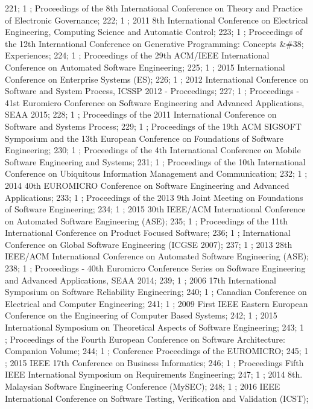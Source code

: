 221; 1 ; Proceedings of the 8th International Conference on Theory and Practice of Electronic Governance; 
222; 1 ; 2011 8th International Conference on Electrical Engineering, Computing Science and Automatic Control; 
223; 1 ; Proceedings of the 12th International Conference on Generative Programming: Concepts {\&}{\#}38; Experiences; 
224; 1 ; Proceedings of the 29th ACM/IEEE International Conference on Automated Software Engineering; 
225; 1 ; 2015 International Conference on Enterprise Systems (ES); 
226; 1 ; 2012 International Conference on Software and System Process, ICSSP 2012 - Proceedings; 
227; 1 ; Proceedings - 41st Euromicro Conference on Software Engineering and Advanced Applications, SEAA 2015; 
228; 1 ; Proceedings of the 2011 International Conference on Software and Systems Process; 
229; 1 ; Proceedings of the 19th ACM SIGSOFT Symposium and the 13th European Conference on Foundations of Software Engineering; 
230; 1 ; Proceedings of the 4th International Conference on Mobile Software Engineering and Systems; 
231; 1 ; Proceedings of the 10th International Conference on Ubiquitous Information Management and Communication; 
232; 1 ; 2014 40th EUROMICRO Conference on Software Engineering and Advanced Applications; 
233; 1 ; Proceedings of the 2013 9th Joint Meeting on Foundations of Software Engineering; 
234; 1 ; 2015 30th IEEE/ACM International Conference on Automated Software Engineering (ASE); 
235; 1 ; Proceedings of the 11th International Conference on Product Focused Software; 
236; 1 ; International Conference on Global Software Engineering (ICGSE 2007); 
237; 1 ; 2013 28th IEEE/ACM International Conference on Automated Software Engineering (ASE); 
238; 1 ; Proceedings - 40th Euromicro Conference Series on Software Engineering and Advanced Applications, SEAA 2014; 
239; 1 ; 2006 17th International Symposium on Software Reliability Engineering; 
240; 1 ; Canadian Conference on Electrical and Computer Engineering; 
241; 1 ; 2009 First IEEE Eastern European Conference on the Engineering of Computer Based Systems; 
242; 1 ; 2015 International Symposium on Theoretical Aspects of Software Engineering; 
243; 1 ; Proceedings of the Fourth European Conference on Software Architecture: Companion Volume; 
244; 1 ; Conference Proceedings of the EUROMICRO; 
245; 1 ; 2015 IEEE 17th Conference on Business Informatics; 
246; 1 ; Proceedings Fifth IEEE International Symposium on Requirements Engineering; 
247; 1 ; 2014 8th. Malaysian Software Engineering Conference (MySEC); 
248; 1 ; 2016 IEEE International Conference on Software Testing, Verification and Validation (ICST); 
